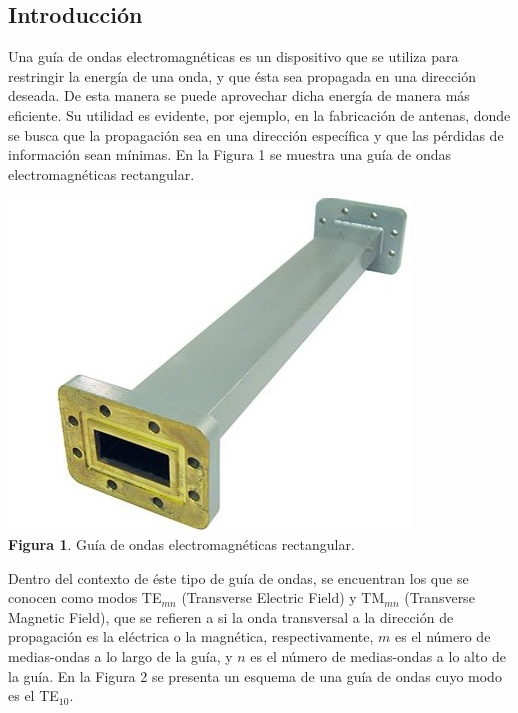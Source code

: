\documentclass[11pt,a4paper]{article}
\begin{document}
\begin{multicols}{2}
\section{Introducción}
Una guía de ondas electromagnéticas es un dispositivo que se utiliza para restringir la energía de una onda, y que ésta sea propagada en una dirección deseada. De esta manera se puede aprovechar dicha energía de manera más eficiente. Su utilidad es evidente, por ejemplo, en la fabricación de antenas, donde se busca que la propagación sea en una dirección específica y que las pérdidas de información sean mínimas. En la Figura 1 se muestra una guía de ondas electromagnéticas rectangular.
\begin{center}
    \includegraphics[scale=0.4]{images/Imagen1.jpg} \\
    \textbf{Figura 1}. Guía de ondas electromagnéticas rectangular.
\end{center}
Dentro del contexto de éste tipo de guía de ondas, se encuentran los que se conocen como modos TE$_{mn}$ (Transverse Electric Field) y TM$_{mn}$ (Transverse Magnetic Field), que se refieren a si la onda transversal a la dirección de propagación es la eléctrica o la magnética, respectivamente, $m$ es el número de medias-ondas a lo largo de la guía, y $n$ es el número de medias-ondas a lo alto de la guía. En la Figura 2 se presenta un esquema de una guía de ondas cuyo modo es el TE$_{10}$.
\begin{center}

\end{center}
\end{multicols}
\end{document}
